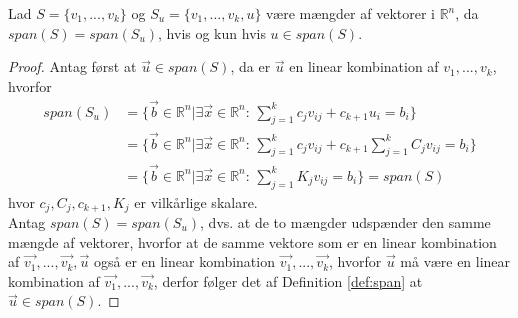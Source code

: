 \begin{stn}
Lad $S = \{v_1,...,v_k\}$ og $S_u = \{v_1,...,v_k, u\}$ være mængder af vektorer i $\mathds{R}^n$, da $span(S) = span(S_u)$, hvis og kun hvis $u \in span(S)$.
\end{stn}
\begin{proof}
Antag først at $\vec{u} \in span(S)$, da er $\vec{u}$ en linear kombination af $v_1,..., v_k$, hvorfor
\begin{align*}
span(S_u) &= \{ \vec{b} \in \mathds{R}^n| \exists \vec{x} \in \mathds{R}^n: \, \sum_{j=1}^k c_j v_{ij} + c_{k+1} u_i  = b_i\}
\\&= \{ \vec{b} \in \mathds{R}^n| \exists \vec{x} \in \mathds{R}^n: \, \sum_{j=1}^k c_j v_{ij} + c_{k+1} \sum_{j=1}^k C_j v_{ij}  = b_i\}
\\&= \{ \vec{b} \in \mathds{R}^n| \exists \vec{x} \in \mathds{R}^n: \, \sum_{j=1}^k K_j v_{ij}  = b_i\} = span(S)
\end{align*}
hvor $c_j, C_j, c_{k+1}, K_j$ er vilkårlige skalare.
\\ Antag $span(S) = span(S_u)$, dvs. at de to mængder udspænder den samme mængde af vektorer, hvorfor at de samme vektore som er en linear kombination af $\vec{v_1},...,\vec{v_k}, \vec{u}$ også er en linear kombination $\vec{v_1},..., \vec{v_k}$, hvorfor $\vec{u}$ må være en linear kombination af  $\vec{v_1},..., \vec{v_k}$, derfor følger det af Definition \ref{def:span} at $\vec{u} \in span(S).$
\end{proof}

